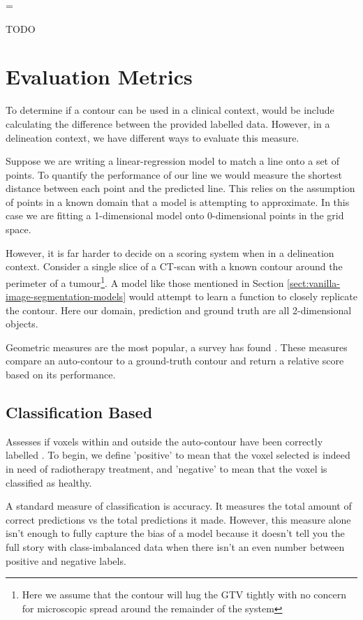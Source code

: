 \documentclass[11pt,twoside]{report}
\newenvironment{warning}
  {\par\begin{mdframed}[linewidth=1pt,linecolor=black]%
    \begin{list}{}{\leftmargin=1cm
                   \labelwidth=\leftmargin}\item[\Large\ding{43}]}
  {\end{list}\end{mdframed}\par}
\begin{document}
\begin{warning}
  TODO
\end{warning}

\chapter{Evaluation Metrics}\label{sect:evaluation-metrics}

To determine if a contour can be used in a clinical context, would be include calculating the difference between the provided labelled data. However, in a delineation context, we have different ways to evaluate this measure.

Suppose we are writing a linear-regression model to match a line onto a set of points. To quantify the performance of our line we would measure the shortest distance between each point and the predicted line. This relies on the assumption of points in a known domain that a model is attempting to approximate. In this case we are fitting a 1-dimensional model onto 0-dimensional points in the grid space. 

However, it is far harder to decide on a scoring system when in a delineation context. Consider a single slice of a CT-scan with a known contour around the perimeter of a tumour\footnote{Here we assume that the contour will hug the GTV tightly with no concern for microscopic spread around the remainder of the system}. A model like those mentioned in Section \ref{sect:vanilla-image-segmentation-models} would attempt to learn a function to closely replicate the contour. Here our domain, prediction and ground truth are all 2-dimensional objects. 

Geometric measures are the most popular, a survey has found \cite{review-metrics}. These measures compare an auto-contour to a ground-truth contour and return a relative score based on its performance. 

\section{Classification Based}\label{sect:classification-based}

Assesses if voxels within and outside the auto-contour have been correctly labelled \cite{review-metrics}. To begin, we define 'positive' to mean that the voxel selected is indeed in need of radiotherapy treatment, and 'negative' to mean that the voxel is classified as healthy.

A standard measure of classification is accuracy. It measures the total amount of correct predictions vs the total predictions it made. However, this measure alone isn't enough to fully capture the bias of a model because it doesn't tell you the full story with class-imbalanced data when there isn't an even number between positive and negative labels.
\end{document}
